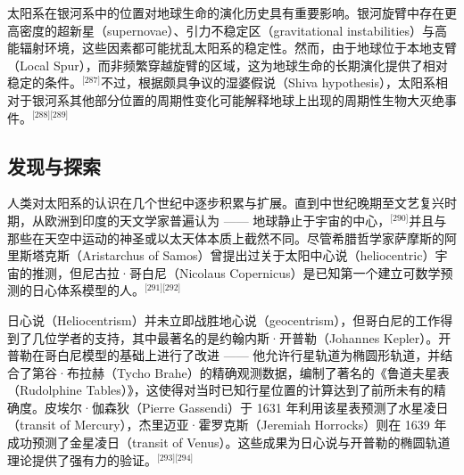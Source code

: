 太阳系在银河系中的位置对地球生命的演化历史具有重要影响。银河旋臂中存在更高密度的超新星（supernovae）、引力不稳定区（gravitational instabilities）与高能辐射环境，这些因素都可能扰乱太阳系的稳定性。然而，由于地球位于本地支臂（Local Spur），而非频繁穿越旋臂的区域，这为地球生命的长期演化提供了相对稳定的条件。\(^\text{[287]}\)不过，根据颇具争议的湿婆假说（Shiva hypothesis），太阳系相对于银河系其他部分位置的周期性变化可能解释地球上出现的周期性生物大灭绝事件。\(^\text{[288][289]}\)  
\subsection{发现与探索}
人类对太阳系的认识在几个世纪中逐步积累与扩展。直到中世纪晚期至文艺复兴时期，从欧洲到印度的天文学家普遍认为 —— 地球静止于宇宙的中心，\(^\text{[290]}\)并且与那些在天空中运动的神圣或以太天体本质上截然不同。尽管希腊哲学家萨摩斯的阿里斯塔克斯（Aristarchus of Samos）曾提出过关于太阳中心说（heliocentric）宇宙的推测，但尼古拉·哥白尼（Nicolaus Copernicus）是已知第一个建立可数学预测的日心体系模型的人。\(^\text{[291][292]}\) 

日心说（Heliocentrism）并未立即战胜地心说（geocentrism），但哥白尼的工作得到了几位学者的支持，其中最著名的是约翰内斯·开普勒（Johannes Kepler）。开普勒在哥白尼模型的基础上进行了改进 —— 他允许行星轨道为椭圆形轨道，并结合了第谷·布拉赫（Tycho Brahe）的精确观测数据，编制了著名的《鲁道夫星表（Rudolphine Tables）》，这使得对当时已知行星位置的计算达到了前所未有的精确度。皮埃尔·伽森狄（Pierre Gassendi）于 1631 年利用该星表预测了水星凌日（transit of Mercury），杰里迈亚·霍罗克斯（Jeremiah Horrocks）则在 1639 年成功预测了金星凌日（transit of Venus）。这些成果为日心说与开普勒的椭圆轨道理论提供了强有力的验证。\(^\text{[293][294]}\)  

